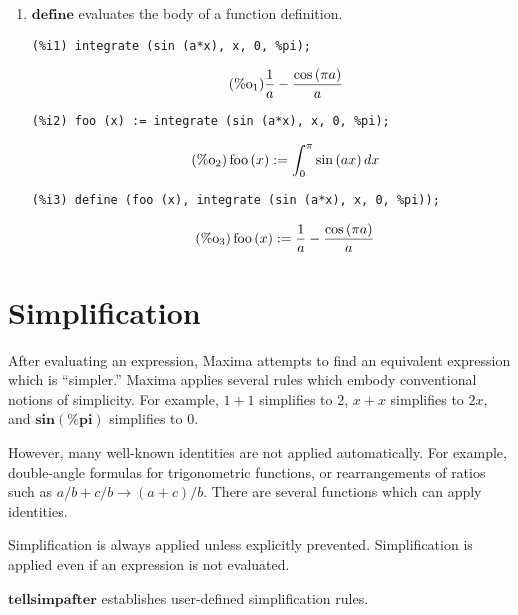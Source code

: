 \documentclass[12pt,leqno]{article}
\begin{document}
\begin{enumerate}
\item $\mathbf{define}$ evaluates the body of a function definition.
\begin{verbatim}
(%i1) integrate (sin (a*x), x, 0, %pi);
\end{verbatim}
\begin{equation}
\tag{$\mathop{\mathrm{\%o}_{1}}$}\frac{1}{a}-\frac{\cos \left(\pi a\right)}{a}
\label{eq:doc-group1-code20-1-1}
\end{equation}
\begin{verbatim}
(%i2) foo (x) := integrate (sin (a*x), x, 0, %pi);
\end{verbatim}
\begin{equation}
\tag{$\mathop{\mathrm{\%o}_{2}}$}\mathop{\mathrm{foo}}\left(x\right) := \int_{0}^{\pi}\sin \left(a x\right)\mathop{dx}
\label{eq:doc-group1-code20-2-1}
\end{equation}
\begin{verbatim}
(%i3) define (foo (x), integrate (sin (a*x), x, 0, %pi));
\end{verbatim}
\begin{equation}
\tag{$\mathop{\mathrm{\%o}_{3}}$}\mathop{\mathrm{foo}}\left(x\right) := \frac{1}{a}-\frac{\cos \left(\pi a\right)}{a}
\label{eq:doc-group1-code20-3-1}
\end{equation}


\end{enumerate}

\section{Simplification}

After evaluating an expression,
Maxima attempts to find an equivalent expression which is ``simpler.''
Maxima applies several rules which embody conventional notions of simplicity.
For example,
$1 + 1$ simplifies to $2$,
$x + x$ simplifies to $2 x$,
and $\mathbf{sin}(\mathbf{\%pi})$ simplifies to $0$.

However,
many well-known identities are not applied automatically.
For example,
double-angle formulas for trigonometric functions,
or rearrangements of ratios such as $a/b + c/b \rightarrow (a + c)/b$.
There are several functions which can apply identities.

Simplification is always applied unless explicitly prevented.
Simplification is applied even if an expression is not evaluated.

$\mathbf{tellsimpafter}$ establishes user-defined simplification rules.
\end{document}
